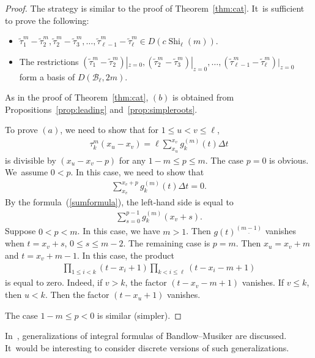 \documentclass[pdftex]{sigma}
\numberwithin{equation}{section}
\newcommand{\B}{\mathcal{B}}
\newcommand{\Shi}{\operatorname{Shi}}
\newcommand{\sint}{\sum\nolimits}
\begin{document}
\begin{proof}
The strategy is similar to the proof of Theorem~\ref{thm:cat}. It~is sufficient to prove the
following:
\begin{itemize}\itemsep=0pt
\item[$(a)$]
$\widetilde{\tau}_1^m-\widetilde{\tau}_2^m, \widetilde{\tau}_2^m-\widetilde{\tau}_3^m, \dots,
\widetilde{\tau}_{\ell-1}^m-\widetilde{\tau}_\ell^m\in D(c\Shi_\ell(m))$.
\item[$(b)$]
The restrictions
$(\widetilde{\tau}_1^m-\widetilde{\tau}_2^m)|_{z=0},
(\widetilde{\tau}_2^m-\widetilde{\tau}_3^m)|_{z=0}, \dots,
(\widetilde{\tau}_{\ell-1}^m-\widetilde{\tau}_\ell^m)|_{z=0}$
form a basis of $D(\B_\ell, 2m)$.
\end{itemize}
As in the proof of Theorem~\ref{thm:cat}, $(b)$ is obtained from
Propositions~\ref{prop:leading} and~\ref{prop:simpleroots}.

To prove $(a)$, we need to show that for $1\leq u<v\leq \ell$,
\begin{gather*}
\tau_k^m(x_u-x_v)=\ell\sint_{x_u}^{x_v}g_k^{(m)}(t) \Delta t
\end{gather*}
is divisible by $(x_u-x_v-p)$ for any $1-m\leq p\leq m$.
The case $p=0$ is obvious. We~assume $0<p$. In this case, we need
to show that
\begin{gather*}
\sint_{x_v}^{x_v+p}g_k^{(m)}(t) \Delta t=0.
\end{gather*}
By the formula~(\ref{sumformula}), the left-hand side is equal to
\begin{gather*}
\sum_{s=0}^{p-1}g_k^{(m)}(x_v+s).
\end{gather*}
Suppose $0<p<m$. In this case, we have $m>1$. Then
$g(t)^{\underline{(m-1)}}$ vanishes when $t=x_v+s$, $0\leq s\leq m-2$.
The remaining case is $p=m$. Then $x_u=x_v+m$ and $t=x_v+m-1$.
In this case, the product
\begin{gather*}
\prod_{1\leq i<k}(t-x_i+1)
\prod_{k<i\leq\ell}(t-x_i-m+1)
\end{gather*}
is equal to zero. Indeed, if $v>k$, the factor $(t-x_v-m+1)$ vanishes.
If $v\leq k$, then $u<k$. Then the factor $(t-x_u+1)$ vanishes.

The case $1-m\leq p<0$ is similar (simpler).
\end{proof}

\begin{Remark}
In~\cite{tsu}, generalizations of integral formulas of
Bandlow--Musiker are discussed. It~would be interesting to
consider discrete versions of such generalizations.
\end{Remark}
\end{document}
